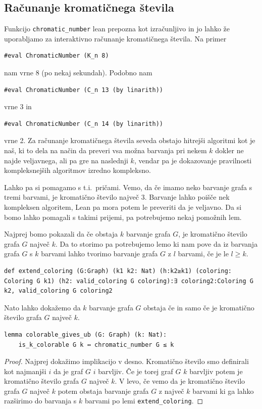 \documentclass[mat1]{fmfdelo}
\begin{document}
\subsection{Računanje kromatičnega števila}
Funkcijo \lstinline{chromatic_number} lean prepozna kot izračunljivo in jo lahko že uporabljamo za interaktivno računanje
kromatičnega števila. Na primer
\begin{lstlisting}
#eval ChromaticNumber (K_n 8)
\end{lstlisting}
nam vrne 8 (po nekaj sekundah). Podobno nam
\begin{lstlisting}
#eval ChromaticNumber (C_n 13 (by linarith))
\end{lstlisting}
vrne 3 in
\begin{lstlisting}
#eval ChromaticNumber (C_n 14 (by linarith))
\end{lstlisting}
vrne 2. Za računanje kromatičnega števila seveda obstajo hitrejši algoritmi kot je naš, 
ki to dela na način da preveri vsa možna barvanja pri nekem $k$ dokler ne najde veljavnega, ali pa gre 
na naslednji $k$, vendar pa je dokazovanje pravilnosti kompleksnejših algoritmov izredno kompleksno.

Lahko pa si pomagamo s t.i.\ pričami. Vemo, da če imamo neko barvanje grafa s tremi barvami, je kromatično število največ 3. 
Barvanje lahko poišče nek kompleksen algoritem, Lean pa mora potem le preveriti da je veljavno. Da si bomo lahko pomagali s takimi
prijemi, pa potrebujemo nekaj pomožnih lem. 

Najprej bomo pokazali da če obstaja $k$ barvanje grafa $G$, je kromatično število grafa $G$ največ $k$. Da to storimo pa potrebujemo
lemo ki nam pove da iz barvanja grafa $G$ s $k$ barvami lahko tvorimo barvanje grafa $G$ z $l$ barvami, če je le $l\geq k$.
\begin{lstlisting}
def extend_coloring (G:Graph) (k1 k2: Nat) (h:k2≥k1) (coloring: Coloring G k1) (h2: valid_coloring G coloring):∃ coloring2:Coloring G k2, valid_coloring G coloring2
\end{lstlisting}
Nato lahko dokažemo da $k$ barvanje grafa $G$ obstaja če in samo če je kromatično število grafa $G$ največ $k$.
\begin{lstlisting}
lemma colorable_gives_ub (G: Graph) (k: Nat):
    is_k_colorable G k ↔ chromatic_number G ≤ k
\end{lstlisting}
\begin{proof}
Najprej dokažimo implikacijo v desno. Kromatično število smo definirali kot najmanjši $i$ da je graf $G$ $i$ barvljiv.
Če je torej graf $G$ $k$ barvljiv potem je kromatično število grafa $G$ največ $k$.
V levo, če vemo da je kromatično število grafa $G$ največ $k$ potem obstaja barvanje grafa $G$ z največ $k$ barvami
ki ga lahko razširimo do barvanja s $k$ barvami po lemi \lstinline{extend_coloring}.
\end{proof}
\end{document}
